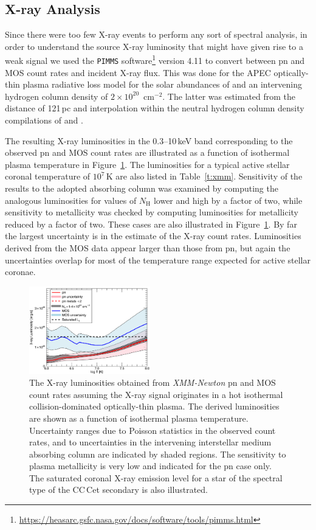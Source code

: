 \documentclass[fleqn,usenatbib]{mnras}
\begin{document}
\subsection{X-ray Analysis}
\label{sec:x-rays}
Since there were too few X-ray events to perform any sort of spectral analysis, in order to understand the source X-ray luminosity that might have given rise to a weak signal we used the {\tt PIMMS} software\footnote{\url{https://heasarc.gsfc.nasa.gov/docs/software/tools/pimms.html}} version 4.11 to convert between pn and MOS count rates and incident X-ray flux. This was done for the APEC optically-thin plasma radiative loss model \citep{fosteretal12-1} for the solar abundances of \citet{asplundetal09-1} and an intervening hydrogen column density of $2\times 10^{20}$~cm$^{-2}$. The latter was estimated from the distance of 121\,pc  \citep{gaia18-1} and interpolation within the neutral hydrogen column density compilations of \citet{Linsky.etal:19} and \citet{Gudennavar.etal:12}.  

The resulting X-ray luminosities in the 0.3--10\,keV band corresponding to the  observed pn and MOS count rates are illustrated as a function of isothermal plasma temperature in Figure~\ref{f:xmmlx}. The  luminosities for a typical active stellar coronal temperature of $10^7$\,K are also listed in Table~\ref{t:xmm}. Sensitivity of the results to the adopted absorbing column was examined by computing the analogous luminosities for values of $N_\mathrm{H}$ lower and high by a factor of two, while sensitivity to metallicity was checked by computing luminosities for metallicity reduced by a factor of two. These cases are also illustrated in Figure~\ref{f:xmmlx}.  By far the largest uncertainty is in the estimate of the X-ray count rates. Luminosities derived from the MOS data appear larger than those from pn, but again the uncertainties overlap for most of the temperature range expected for active stellar coronae.

\begin{figure}
    \centering
    \includegraphics[width=0.47\textwidth]{cccet.png}
    \caption{The X-ray luminosities obtained from {\it XMM-Newton} pn and MOS count rates assuming the X-ray signal originates in a hot isothermal  collision-dominated  optically-thin plasma. The derived luminosities are shown as a function of isothermal plasma temperature. Uncertainty ranges due to Poisson statistics in the observed count rates, and to uncertainties in the intervening interstellar medium absorbing column are indicated by shaded regions. The sensitivity to plasma metallicity is very low and indicated for the pn case only. The saturated coronal X-ray emission level for a star of the spectral type of the CC\,Cet secondary is also illustrated.}
    \label{f:xmmlx}
\end{figure}
\end{document}
